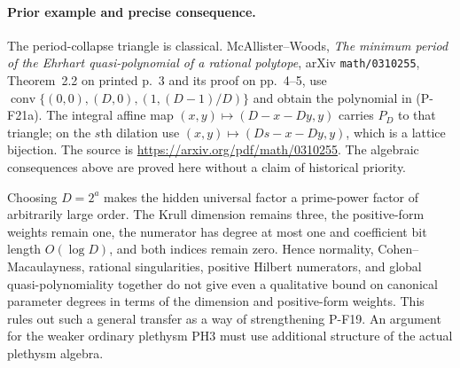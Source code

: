 \paragraph{Prior example and precise consequence.}
The period-collapse triangle is classical. McAllister--Woods,
\emph{The minimum period of the Ehrhart quasi-polynomial of a
rational polytope}, arXiv \texttt{math/0310255}, Theorem~2.2 on
printed p.~3 and its proof on pp.~4--5, use
$\operatorname{conv}\{(0,0),(D,0),(1,(D-1)/D)\}$ and obtain
the polynomial in (P-F21a). The integral affine map
$(x,y)\mapsto(D-x-Dy,y)$ carries $P_D$ to that triangle;
on the $s$th dilation use $(x,y)\mapsto(Ds-x-Dy,y)$, which
is a lattice bijection. The source is
\url{https://arxiv.org/pdf/math/0310255}.
The algebraic consequences above are proved here without a claim
of historical priority.

Choosing $D=2^a$ makes the hidden universal factor a prime-power
factor of arbitrarily large order. The Krull dimension remains
three, the positive-form weights remain one, the numerator has
degree at most one and coefficient bit length $O(\log D)$, and
both indices remain zero. Hence normality, Cohen--Macaulayness,
rational singularities, positive Hilbert numerators, and global
quasi-polynomiality together do not give even a qualitative bound
on canonical parameter degrees in terms of the dimension and
positive-form weights. This rules out such a general transfer
as a way of strengthening P-F19. An argument for the weaker
ordinary plethysm PH3 must use additional structure of the actual
plethysm algebra.
